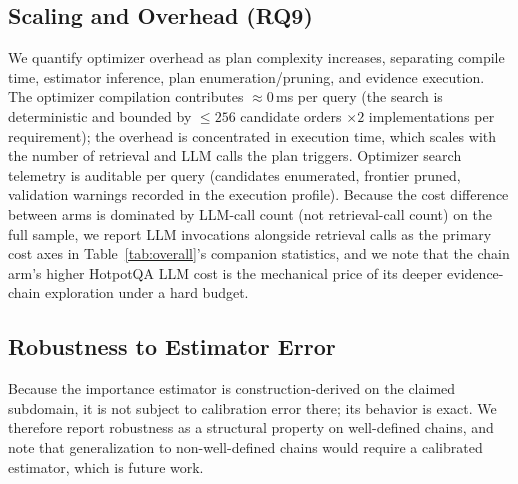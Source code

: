 \subsection{Scaling and Overhead (RQ9)}
We quantify optimizer overhead as plan complexity increases, separating
compile time, estimator inference, plan enumeration/pruning, and evidence
execution. The optimizer compilation contributes $\approx 0$\,ms per query
(the search is deterministic and bounded by $\le 256$ candidate orders $\times
2$ implementations per requirement); the overhead is concentrated in execution
time, which scales with the number of retrieval and LLM calls the plan
triggers. Optimizer search telemetry is auditable per query (candidates
enumerated, frontier pruned, validation warnings recorded in the execution
profile). Because the cost difference between arms is dominated by LLM-call
count (not retrieval-call count) on the full sample, we report LLM invocations
alongside retrieval calls as the primary cost axes in Table~\ref{tab:overall}'s
companion statistics, and we note that the chain arm's higher HotpotQA LLM cost
is the mechanical price of its deeper evidence-chain exploration under a hard
budget.

\subsection{Robustness to Estimator Error}
Because the importance estimator is construction-derived on the claimed
subdomain, it is not subject to calibration error there; its behavior is exact.
We therefore report robustness as a structural property on well-defined chains,
and note that generalization to non-well-defined chains would require a
calibrated estimator, which is future work.

